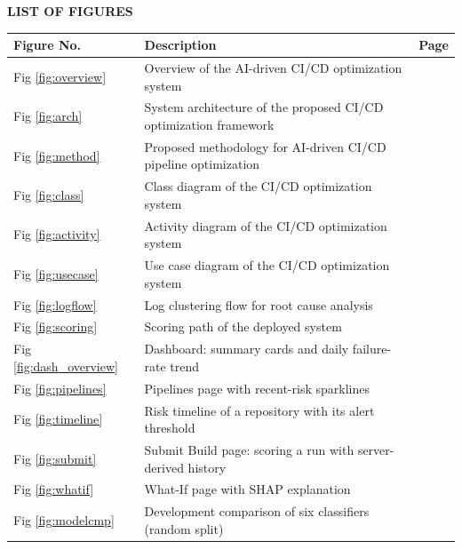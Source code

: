 \begin{center}\fontsize{14}{17}\selectfont\bfseries LIST OF FIGURES\end{center}
\label{fm:lof}
{\renewcommand{\arraystretch}{1.2}
\begin{longtable}{|>{\centering\arraybackslash}p{1.6cm}|p{11.2cm}|>{\centering\arraybackslash}p{1.3cm}|}
\hline
\textbf{Figure No.} & \textbf{Description} & \textbf{Page}\\ \hline
\endhead
Fig \ref{fig:overview} & Overview of the AI-driven CI/CD optimization system & \pageref{fig:overview}\\ \hline
Fig \ref{fig:arch} & System architecture of the proposed CI/CD optimization framework & \pageref{fig:arch}\\ \hline
Fig \ref{fig:method} & Proposed methodology for AI-driven CI/CD pipeline optimization & \pageref{fig:method}\\ \hline
Fig \ref{fig:class} & Class diagram of the CI/CD optimization system & \pageref{fig:class}\\ \hline
Fig \ref{fig:activity} & Activity diagram of the CI/CD optimization system & \pageref{fig:activity}\\ \hline
Fig \ref{fig:usecase} & Use case diagram of the CI/CD optimization system & \pageref{fig:usecase}\\ \hline
Fig \ref{fig:logflow} & Log clustering flow for root cause analysis & \pageref{fig:logflow}\\ \hline
Fig \ref{fig:scoring} & Scoring path of the deployed system & \pageref{fig:scoring}\\ \hline
Fig \ref{fig:dash_overview} & Dashboard: summary cards and daily failure-rate trend & \pageref{fig:dash_overview}\\ \hline
Fig \ref{fig:pipelines} & Pipelines page with recent-risk sparklines & \pageref{fig:pipelines}\\ \hline
Fig \ref{fig:timeline} & Risk timeline of a repository with its alert threshold & \pageref{fig:timeline}\\ \hline
Fig \ref{fig:submit} & Submit Build page: scoring a run with server-derived history & \pageref{fig:submit}\\ \hline
Fig \ref{fig:whatif} & What-If page with SHAP explanation & \pageref{fig:whatif}\\ \hline
Fig \ref{fig:modelcmp} & Development comparison of six classifiers (random split) & \pageref{fig:modelcmp}\\ \hline

\end{longtable}}
